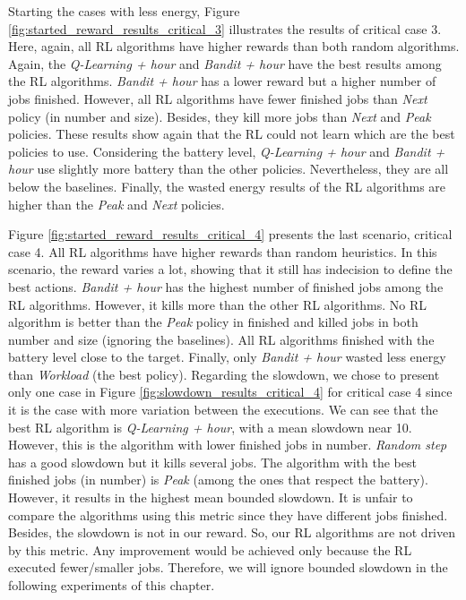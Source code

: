Starting the cases with less energy, Figure \ref{fig:started_reward_results_critical_3} illustrates the results of critical case 3. Here, again, all RL algorithms have higher rewards than both random algorithms. Again, the \emph{Q-Learning + hour} and \emph{Bandit + hour} have the best results among the RL algorithms. \emph{Bandit + hour} has a lower reward but a higher number of jobs finished. However, all RL algorithms have fewer finished jobs than \emph{Next} policy (in number and size). Besides, they kill more jobs than \emph{Next} and \emph{Peak} policies. These results show again that the RL could not learn which are the best policies to use. Considering the battery level, \emph{Q-Learning + hour} and \emph{Bandit + hour} use slightly more battery than the other policies. Nevertheless, they are all below the baselines. Finally, the wasted energy results of the RL algorithms are higher than the \emph{Peak} and \emph{Next} policies.

Figure \ref{fig:started_reward_results_critical_4} presents the last scenario, critical case 4. All RL algorithms have higher rewards than random heuristics. In this scenario, the reward varies a lot, showing that it still has indecision to define the best actions. \emph{Bandit + hour} has the highest number of finished jobs among the RL algorithms. However, it kills more than the other RL algorithms. No RL algorithm is better than the \emph{Peak} policy in finished and killed jobs in both number and size (ignoring the baselines). All RL algorithms finished with the battery level close to the target. Finally, only \emph{Bandit + hour} wasted less energy than \emph{Workload} (the best policy). Regarding the slowdown, we chose to present only one case in Figure \ref{fig:slowdown_results_critical_4} for critical case 4 since it is the case with more variation between the executions. We can see that the best RL algorithm is \emph{Q-Learning + hour}, with a mean slowdown near 10. However, this is the algorithm with lower finished jobs in number. \emph{Random step} has a good slowdown but it kills several jobs. The algorithm with the best finished jobs (in number) is \emph{Peak} (among the ones that respect the battery). However, it results in the highest mean bounded slowdown. It is unfair to compare the algorithms using this metric since they have different jobs finished. Besides, the slowdown is not in our reward. So, our RL algorithms are not driven by this metric. Any improvement would be achieved only because the RL executed fewer/smaller jobs. Therefore, we will ignore bounded slowdown in the following experiments of this chapter.

